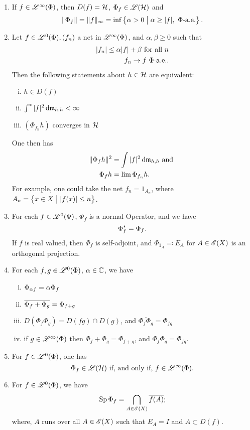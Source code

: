 \begin{thrm}
  \leavevmode
  \begin{enumerate}
   \item   

 If $f \in \mathscr{L}^\infty (\Phi)$, then $D(f) = \mathcal{H}$, $ \Phi_f \in \mathscr{L}(\mathcal{H})$ and
 \[
 \| \Phi_f \| = \| f\|_\infty = \inf \left\lbrace \alpha > 0 \bigm | \alpha \geq |f|, ~\Phi\text{-a.e.}\right\rbrace.
 \]

 
\item 
Let $f \in \mathscr{L}^0(\Phi), (f_n)$ a net in $\mathscr{L}^\infty (\Phi)$, and $\alpha, \beta \geq 0$ such that
 \begin{align*}
   | f_n | \leq \alpha |f| + \beta \text{ for all } n \\
   f_n \to f ~\Phi\text{-a.e.}.
 \end{align*}
Then the following statements about $h \in \mathcal{H}$ are equivalent:
\begin{enumerate}[(i)]
 \item $h \in D(f)$
 \item $\int ^{*} | f| ^2 \operatorname{d}\! \mathfrak{m}_{h,h} < \infty$
 \item $(\Phi_{f_n}h)$ converges in $ \mathcal{H}$
\end{enumerate}
One then has
\begin{align*}
  \| \Phi_f h \| ^2 &= \int |f|^2 \operatorname{d}\! \mathfrak{m}_{h, h } \text{ and }\\
  \Phi_{f }h &= \lim \Phi_{f_n} h.
\end{align*}
For example, one could take the net $f_n = 1_{A_n}$, where $A_n = \left\lbrace x \in X \bigm | | f(x) | \leq n \right\rbrace$.

\item
For each $f \in \mathscr{L}^0(\Phi)$, $\Phi_f$ is a normal Operator, and we have
\[
 \Phi_f ^{*} = \Phi_f. 
\]
If $f$ is real valued, then $\Phi_f$ is self-adjoint, and $\Phi_{1_A} \eqqcolon E_A$ for $ A \in \mathscr{E}(X)$ is an orthogonal projection. 

\item 
For each $f, g \in \mathscr{L}^0(\Phi)$, $\alpha \in \mathbb{C}$, we have

\begin{enumerate}[(i)]
  \item $\Phi_{\alpha f} = \alpha \Phi_f$
  \item $ \overline{\Phi_f + \Phi_g} = \Phi_{f + g}$
  \item $D(\Phi_f \Phi_g) = D(fg) \cap D(g)$, and $\overline{\Phi_f \Phi_g} = \Phi_{fg}$
  \item if $g \in \mathscr{L}^\infty (\Phi)$ then $\Phi_f + \Phi_g = \Phi_{f+g}$, and $\Phi_f \Phi_g = \Phi_{fg}$.
\end{enumerate}

\item
For $f \in \mathscr{L}^0(\Phi)$, one has
\[
\Phi_f \in \mathscr{L}(\mathcal{H}) \text{ if, and only if, } f \in \mathscr{L}^\infty (\Phi).
\]

\item
For $f \in \mathscr{L}^0(\Phi)$, we have
\[
\operatorname{Sp} \Phi_f = \bigcap_{A \in \mathscr{E}(X)} \overline{f(A)};
\]
where, $A$ runs over all $A \in \mathscr{E}(X)$ such that $E_A = I$ and $A \subset D(f)$.


\end{enumerate}

\end{thrm}












